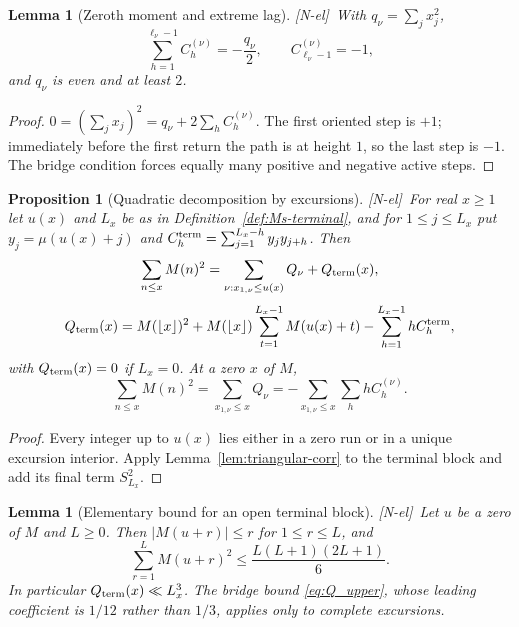 \documentclass[11pt,reqno]{amsart}
\numberwithin{equation}{section}
\theoremstyle{plain}
\newtheorem{proposition}[theorem]{Proposition}
\newtheorem{lemma}[theorem]{Lemma}
\theoremstyle{definition}
\theoremstyle{remark}
\newcommand{\tagNE}{\textup{[N-el]}}
\begin{document}
\begin{lemma}[Zeroth moment and extreme lag]
\label{lem:zeroth-corr}
\tagNE\ With $q_\nu=\sum_jx_j^2$,
\begin{equation}
\label{eq:zeroth-corr}
\sum_{h=1}^{\ell_\nu-1}C_h^{(\nu)}=-\frac{q_\nu}{2},\qquad
C_{\ell_\nu-1}^{(\nu)}=-1,
\end{equation}
and $q_\nu$ is even and at least $2$.
\end{lemma}

\begin{proof}
$0=(\sum_jx_j)^2=q_\nu+2\sum_hC_h^{(\nu)}$. The first oriented step is $+1$;
immediately before the first return the path is at height $1$, so the last
step is $-1$. The bridge condition forces equally many positive and negative
active steps.
\end{proof}

\begin{proposition}[Quadratic decomposition by excursions]
\label{prop:quadratic-decomp}
\tagNE\ For real $x\ge1$ let $u(x)$ and $L_x$ be as in
Definition~\ref{def:Ms-terminal}, and for $1\le j\le L_x$ put
$y_j=\mu(u(x)+j)$ and $C_h^{\rm term}=\sum_{j=1}^{L_x-h}y_jy_{j+h}$. Then
\begin{equation}
\label{eq:quadratic-decomp-general}
\sum_{n\le x}M(n)^2
=\sum_{\nu:x_{1,\nu}\le u(x)}Q_\nu+Q_{\rm term}(x),
\end{equation}
\begin{equation}
\label{eq:terminal-Q-exact}
Q_{\rm term}(x)=M(\lfloor x\rfloor)^2
+M(\lfloor x\rfloor)\sum_{t=1}^{L_x-1}M(u(x)+t)
-\sum_{h=1}^{L_x-1}hC_h^{\rm term},
\end{equation}
with $Q_{\rm term}(x)=0$ if $L_x=0$. At a zero $x$ of $M$,
\begin{equation}
\label{eq:quadratic-decomp-zero}
\sum_{n\le x}M(n)^2
=\sum_{x_{1,\nu}\le x}Q_\nu
=-\sum_{x_{1,\nu}\le x}\sum_hhC_h^{(\nu)}.
\end{equation}
\end{proposition}

\begin{proof}
Every integer up to $u(x)$ lies either in a zero run or in a unique excursion
interior. Apply Lemma~\ref{lem:triangular-corr} to the terminal block and
add its final term $S_{L_x}^2$.
\end{proof}

\begin{lemma}[Elementary bound for an open terminal block]
\label{lem:terminal-Q-elementary}
\tagNE\ Let $u$ be a zero of $M$ and $L\ge0$. Then $|M(u+r)|\le r$ for
$1\le r\le L$, and
\begin{equation}
\label{eq:terminal-Q-elementary}
\sum_{r=1}^{L}M(u+r)^2\le\frac{L(L+1)(2L+1)}6 .
\end{equation}
In particular $Q_{\rm term}(x)\ll L_x^3$. The bridge bound
\eqref{eq:Q_upper}, whose leading coefficient is $1/12$ rather than $1/3$,
applies only to complete excursions.
\end{lemma}
\end{document}
